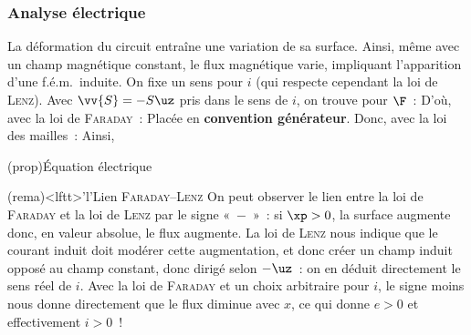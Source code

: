 \documentclass[../../main/main.tex]{subfiles}
\begin{document}
\subsubsection{Analyse électrique}
\label{sssec:rlplgene_anaelec}
La déformation du circuit entraîne une variation de sa surface. Ainsi, même avec
un champ magnétique constant, le flux magnétique varie, impliquant l'apparition
d'une f.é.m.\ induite.
\bigbreak
\noindent
On fixe un sens pour $i$ (qui respecte cependant la loi de \textsc{Lenz}).
Avec $\vv{S} = -S\uz$ pris dans le sens de $i$, on trouve pour $\F$~:
\psw{%
	\[
		\F = B\uz \cdot -S\uz = -BS = -B \ell x
	\]
}%
D'où, avec la loi de \textsc{Faraday}~:
\psw{%
	\[
		e = -\dv{\F}{t} = B \ell \xp
	\]
}%
Placée en \textbf{convention générateur}. Donc, avec la loi des mailles~:
\psw{%
	\[
		e = Ri + U
		\qquad \Ra \qquad
		B \ell \xp = Ri + U
	\]
}%
Ainsi,
\begin{tcb*}(prop){Équation électrique}
\end{tcb*}

\begin{tcb}(rema)<lftt>'l'{Lien \textsc{Faraday}--\textsc{Lenz}}
	On peut observer le lien entre la loi de \textsc{Faraday} et la loi de
	\textsc{Lenz} par le signe «~$-$~»~: si $\xp > 0$, la surface augmente donc, en
	valeur absolue, le flux augmente.
	\smallbreak
	La loi de \textsc{Lenz} nous indique que le
	courant induit doit modérer cette augmentation, et donc créer un champ induit
	opposé au champ constant, donc dirigé selon $-\uz$~: on en déduit directement
	le sens réel de $i$.
	\smallbreak
	Avec la loi de \textsc{Faraday} et un choix arbitraire pour $i$, le signe
	moins nous donne directement que le flux diminue avec $x$, ce qui donne $e >
		0$ et effectivement $i > 0$~!
\end{tcb}
\end{document}
